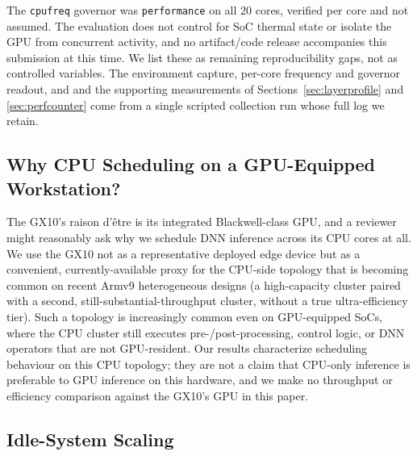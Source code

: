 \documentclass[conference]{IEEEtran}
\begin{document}
The \texttt{cpufreq} governor was \texttt{performance} on all 20 cores, verified per core and not assumed. The evaluation does not control for SoC thermal state or isolate the GPU from concurrent activity, and no artifact/code release accompanies this submission at this time. We list these as remaining reproducibility gaps, not as controlled variables. The environment capture, per-core frequency and governor readout, and and the supporting measurements of Sections~\ref{sec:layerprofile} and \ref{sec:perfcounter} come from a single scripted collection run whose full log we retain.

\subsection{Why CPU Scheduling on a GPU-Equipped Workstation?}
\label{sec:whycpu}
The GX10's raison d'\^{e}tre is its integrated Blackwell-class GPU, and a reviewer might reasonably ask why we schedule DNN inference across its CPU cores at all. We use the GX10 not as a representative deployed edge device but as a convenient, currently-available proxy for the CPU-side topology that is becoming common on recent Armv9 heterogeneous designs (a high-capacity cluster paired with a second, still-substantial-throughput cluster, without a true ultra-efficiency tier). Such a topology is increasingly common even on GPU-equipped SoCs, where the CPU cluster still executes pre-/post-processing, control logic, or DNN operators that are not GPU-resident. Our results characterize scheduling behaviour on this CPU topology; they are not a claim that CPU-only inference is preferable to GPU inference on this hardware, and we make no throughput or efficiency comparison against the GX10's GPU in this paper.

\subsection{Idle-System Scaling}
\label{sec:idle}
\end{document}
